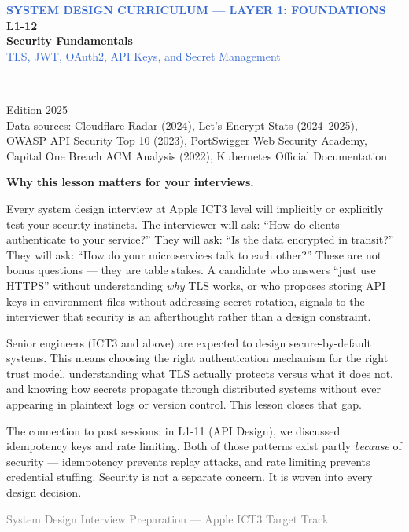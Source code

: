 \documentclass[11pt,a4paper]{article}
\begin{document}
\begin{titlepage}
\centering
\vspace*{2cm}

{\footnotesize\textcolor{highlight}{\textbf{SYSTEM DESIGN CURRICULUM --- LAYER 1: FOUNDATIONS}}}\\[0.4cm]
{\Large\bfseries\textcolor{primary}{L1-12}}\\[0.3cm]
{\Huge\bfseries\textcolor{primary}{Security Fundamentals}}\\[0.5cm]
{\large\textcolor{highlight}{TLS, JWT, OAuth2, API Keys, and Secret Management}}\\[0.8cm]
\rule{0.5\textwidth}{0.6pt}\\[0.8cm]
{\normalsize Edition 2025}\\[0.2cm]
{\small Data sources: Cloudflare Radar (2024), Let's Encrypt Stats (2024--2025),\\
OWASP API Security Top 10 (2023), PortSwigger Web Security Academy,\\
Capital One Breach ACM Analysis (2022), Kubernetes Official Documentation}\\[1.5cm]

\begin{insightbox}
\textbf{Why this lesson matters for your interviews.}

Every system design interview at Apple ICT3 level will implicitly or explicitly test your security instincts. The interviewer will ask: ``How do clients authenticate to your service?'' They will ask: ``Is the data encrypted in transit?'' They will ask: ``How do your microservices talk to each other?'' These are not bonus questions --- they are table stakes. A candidate who answers ``just use HTTPS'' without understanding \textit{why} TLS works, or who proposes storing API keys in environment files without addressing secret rotation, signals to the interviewer that security is an afterthought rather than a design constraint.

Senior engineers (ICT3 and above) are expected to design secure-by-default systems. This means choosing the right authentication mechanism for the right trust model, understanding what TLS actually protects versus what it does not, and knowing how secrets propagate through distributed systems without ever appearing in plaintext logs or version control. This lesson closes that gap.

The connection to past sessions: in L1-11 (API Design), we discussed idempotency keys and rate limiting. Both of those patterns exist partly \textit{because} of security --- idempotency prevents replay attacks, and rate limiting prevents credential stuffing. Security is not a separate concern. It is woven into every design decision.
\end{insightbox}

\vfill
{\small\textcolor{gray}{System Design Interview Preparation --- Apple ICT3 Target Track}}
\end{titlepage}
\end{document}
